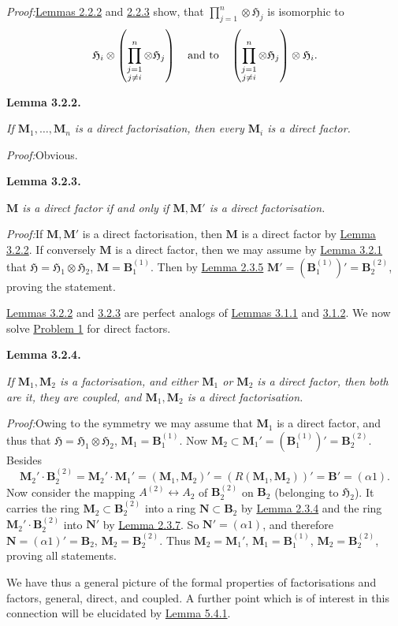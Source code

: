 \documentclass[12pt,b5paper,twoside]{article}
\newcommand{\Hspace}{\mathfrak H}
\newcommand{\M}{\mathbf M}
\newcommand{\N}{\mathbf N}
\newcommand{\B}{\mathbf B}
\newcommand{\Lemma}[1]{%
  \par\smallskip\noindent\phantomsection\label{lem:#1}\textbf{Lemma #1.}\enspace
}
\newcommand{\Proof}{\par\noindent\textit{Proof:}\enspace}
\newcommand{\lemref}[1]{\hyperref[lem:#1]{Lemma #1}}
\newcommand{\probref}[1]{\hyperref[prob:#1]{Problem #1}}
\begin{document}
\Proof \hyperref[lem:2.2.2]{Lemmas 2.2.2} and
\hyperref[lem:2.2.3]{2.2.3} show, that
$\prod_{j=1}^n\otimes\Hspace_j$ is isomorphic to
\[
 \Hspace_i\otimes
 \left(\prod_{\substack{j=1\\j\neq i}}^n\otimes\Hspace_j\right)
 \quad\hbox{and to}\quad
 \left(\prod_{\substack{j=1\\j\neq i}}^n\otimes\Hspace_j\right)
 \otimes\Hspace_i.
\]

\Lemma{3.2.2}
\emph{If $\M_1,\ldots,\M_n$ is a direct factorisation, then every $\M_i$ is
a direct factor.}

\Proof Obvious.

\Lemma{3.2.3}
\emph{$\M$ is a direct factor if and only if $\M,\M'$ is a direct
factorisation.}

\Proof If $\M,\M'$ is a direct factorisation, then $\M$ is a direct factor
by \lemref{3.2.2}. If conversely $\M$ is a direct factor, then we may assume
by \lemref{3.2.1} that
$\Hspace=\Hspace_1\otimes\Hspace_2$, $\M=\B_1^{(1)}$. Then by
\lemref{2.3.5} $\M'=(\B_1^{(1)})'=\B_2^{(2)}$, proving the statement.

\hyperref[lem:3.2.2]{Lemmas 3.2.2} and \hyperref[lem:3.2.3]{3.2.3}
are perfect analogs of \hyperref[lem:3.1.1]{Lemmas 3.1.1} and
\hyperref[lem:3.1.2]{3.1.2}. We now solve \probref{1} for direct
factors.

\Lemma{3.2.4}
\emph{If $\M_1,\M_2$ is a factorisation, and either $\M_1$ or $\M_2$ is a
direct factor, then both are it, they are coupled, and $\M_1,\M_2$ is a direct
factorisation.}

\Proof Owing to the symmetry we may assume that $\M_1$ is a direct factor,
and thus that
$\Hspace=\Hspace_1\otimes\Hspace_2$, $\M_1=\B_1^{(1)}$. Now
$\M_2\subset\M_1'=(\B_1^{(1)})'=\B_2^{(2)}$. Besides
\[
 \M_2'\cdot\B_2^{(2)}=\M_2'\cdot\M_1'
 =(\M_1,\M_2)'=(R(\M_1,\M_2))'=\B'=(\alpha1).
\]
Now consider the mapping $A^{(2)}\leftrightarrow A_2$ of $\B_2^{(2)}$ on
$\B_2$ (belonging to $\Hspace_2$). It carries the ring
$\M_2\subset\B_2^{(2)}$ into a ring $\N\subset\B_2$ by \lemref{2.3.4}
and the ring $\M_2'\cdot\B_2^{(2)}$ into $\N'$ by \lemref{2.3.7}. So
$\N'=(\alpha1)$, and therefore $\N=(\alpha1)'=\B_2$,
$\M_2=\B_2^{(2)}$. Thus $\M_2=\M_1'$, $\M_1=\B_1^{(1)}$,
$\M_2=\B_2^{(2)}$, proving all statements.

We have thus a general picture of the formal properties of factorisations and
factors, general, direct, and coupled. A further point which is of interest in this
connection will be elucidated by \lemref{5.4.1}.
\end{document}
